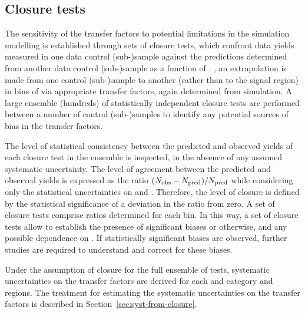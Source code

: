\subsection{Closure tests\label{sec:closure-tests-desc}}

The sensitivity of the transfer factors to potential limitations in
the simulation modelling is established through sets of closure tests,
which confront data yields measured in one data control (sub-)sample
against the predictions determined from another data control
(sub-)sample as a function of \scalht. \ie, an extrapolation is made
from one control (sub-)sample to another (rather than to the signal
region) in bins of \scalht via appropriate transfer factors, again
determined from simulation. A large ensemble (\ie hundreds) of
statistically independent closure tests are performed between a number
of control (sub-)samples to identify any potential sources of bias in
the transfer factors.

The level of statistical consistency between the predicted and
observed yields of each closure test in the ensemble is inspected, in
the absence of any assumed systematic uncertainty. The level of
agreement between the predicted and observed yields is expressed as
the ratio $(N_{\textrm{obs}} - N_{\textrm{pred}})/N_{\textrm{pred}}$ while considering only the
statistical uncertainties on \npre and \nobs. Therefore, the level of
closure is defined by the statistical significance of a deviation in
the ratio from zero. A set of closure tests comprise ratios determined
for each \scalht bin. In this way, a set of closure tests allow to
establish the presence of significant biases or otherwise, and any
possible dependence on \scalht. If statistically significant biases
are observed, further studies are required to understand and correct
for these biases.

Under the assumption of closure for the full ensemble of tests,
systematic uncertainties on the transfer factors are derived for each
\njet and \nb category and \scalht regions. The treatment for
estimating the systematic uncertainties on the transfer factors is
described in Section~\ref{sec:syst-from-closure}.

